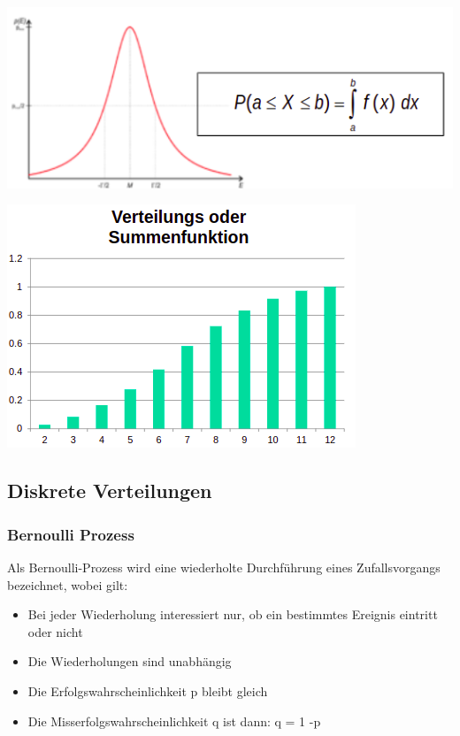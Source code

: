 \begin{minipage}[t]{0.55\textwidth}
\centering
\includegraphics[width=0.9\linewidth]{images/kontinuierliche_verteilungsdichtefunktion.png}
\end{minipage}
\begin{minipage}[t]{0.325\textwidth}
\centering
\includegraphics[width=0.9\linewidth]{images/summenfunktion.png}
\end{minipage}

\subsection{Diskrete Verteilungen}
\subsubsection{Bernoulli Prozess}
Als Bernoulli-Prozess wird eine wiederholte Durchführung eines Zufallsvorgangs bezeichnet, wobei gilt: 
\begin{itemize}
    \item Bei jeder Wiederholung interessiert nur, ob ein bestimmtes Ereignis eintritt oder nicht
    \item Die Wiederholungen sind unabhängig
    \item Die Erfolgswahrscheinlichkeit p bleibt gleich
    \item Die Misserfolgswahrscheinlichkeit q ist dann: q = 1 -p
\end{itemize}

